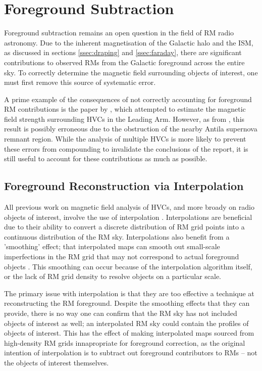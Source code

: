 \chapter{Foreground Subtraction}
\label{cha:FR}

Foreground subtraction remains an open question in the field of RM radio astronomy. Due to the inherent magnetisation of the Galactic halo and the ISM, as discussed in sections \ref{ssec:draping} and \ref{ssec:faraday}, there are significant contributions to observed RMs from the Galactic foreground across the entire sky. To correctly determine the magnetic field surrounding objects of interest, one must first remove this source of systematic error.


A prime example of the consequences of not correctly accounting for foreground RM contributions is the paper by \cite{ID2}, which attempted to estimate the magnetic field strength surrounding HVCs in the Leading Arm. However, as from \cite{ID36}, this result is possibly erroneous due to the obstruction of the nearby Antila supernova remnant region. While the analysis of multiple HVCs is more likely to prevent these errors from compounding to invalidate the conclusions of the report, it is still useful to account for these contributions as much as possible.

\section{Foreground Reconstruction via Interpolation}
\label{sec:intp}

All previous work on magnetic field analysis of HVCs, and more broady on radio objects of interest, involve the use of interpolation \citep{ID3, ID5, ID6, ID26, ID73}. Interpolations are beneficial due to their ability to convert a discrete distribution of RM grid points into a continuous distribution of the RM sky. Interpolations also benefit from a 'smoothing' effect; that interpolated maps can smooth out small-scale imperfections in the RM grid that may not correspond to actual foreground objects \citep{ID44, ID45, ID58}. This smoothing can occur because of the interpolation algorithm itself, or the lack of RM grid density to resolve objects on a particular scale.


The primary issue with interpolation is that they are too effective a technique at reconstructing the RM foreground. Despite the smoothing effects that they can provide, there is no way one can confirm that the RM sky has not included objects of interest as well; an interpolated RM sky could contain the profiles of objects of interest. This has the effect of making interpolated maps sourced from high-density RM grids innapropriate for foreground correction, as the original intention of interpolation is to subtract out foreground contributors to RMs – not the objects of interest themselves.


